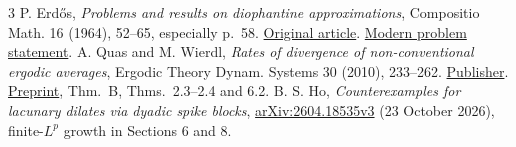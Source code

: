 \documentclass[11pt]{article}
\newcommand{\1}{\mathbf 1}
\begin{document}
\begin{thebibliography}{3}\small
{} P. Erd\H{o}s, \emph{Problems and results on diophantine approximations},
Compositio Math. 16 (1964), 52--65, especially p.~58.
\href{https://www.numdam.org/item/CM_1964__16__52_0/}{Original article}.
\href{https://www.erdosproblems.com/995}{Modern problem statement}.
 A. Quas and M. Wierdl, \emph{Rates of divergence of non-conventional
ergodic averages}, Ergodic Theory Dynam. Systems 30 (2010), 233--262.
\href{https://doi.org/10.1017/S0143385709000054}{Publisher}.
\href{https://arxiv.org/pdf/math/0409001}{Preprint}, Thm.~B, Thms.~2.3--2.4 and 6.2.
 B. S. Ho, \emph{Counterexamples for lacunary dilates via dyadic
spike blocks}, \href{https://arxiv.org/html/2604.18535v3}{arXiv:2604.18535v3}
(23 October 2026), finite-$L^p$ growth in Sections 6 and 8.
\end{thebibliography}
\end{document}
